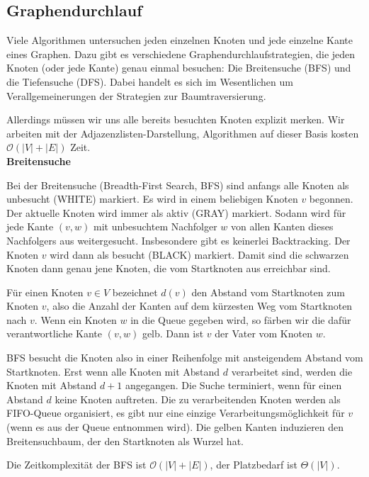 \documentclass[12pt]{article}
\begin{document}
\subsection{Graphendurchlauf}

Viele Algorithmen untersuchen jeden einzelnen Knoten und jede einzelne Kante eines Graphen. Dazu gibt es verschiedene Graphendurchlaufstrategien, die jeden Knoten (oder jede Kante) genau einmal besuchen: Die Breitensuche (BFS) und die Tiefensuche (DFS). Dabei handelt es sich im Wesentlichen um Verallgemeinerungen der Strategien zur Baumtraversierung.

Allerdings müssen wir uns alle bereits besuchten Knoten explizit merken. Wir arbeiten mit der Adjazenzlisten-Darstellung, Algorithmen auf dieser Basis kosten $\mathcal O(|V| + |E|)$ Zeit.\\

\textbf{Breitensuche}

Bei der Breitensuche (Breadth-First Search, BFS) sind anfangs alle Knoten als unbesucht (WHITE) markiert. Es wird in einem beliebigen Knoten $v$ begonnen. Der aktuelle Knoten wird immer als aktiv (GRAY) markiert. Sodann wird für jede Kante $(v, w)$ mit unbesuchtem Nachfolger $w$ von allen Kanten dieses Nachfolgers aus weitergesucht. Insbesondere gibt es keinerlei Backtracking. Der Knoten $v$ wird dann als besucht (BLACK) markiert. Damit sind die schwarzen Knoten dann genau jene Knoten, die vom Startknoten aus erreichbar sind.

Für einen Knoten $v \in V$ bezeichnet $d(v)$ den Abstand vom Startknoten zum Knoten $v$, also die Anzahl der Kanten auf dem kürzesten Weg vom Startknoten nach $v$. Wenn ein Knoten $w$ in die Queue gegeben wird, so färben wir die dafür verantwortliche Kante $(v, w)$ gelb. Dann ist $v$ der Vater vom Knoten $w$.

BFS besucht die Knoten also in einer Reihenfolge mit ansteigendem Abstand vom Startknoten. Erst wenn alle Knoten mit Abstand $d$ verarbeitet sind, werden die Knoten mit Abstand $d+1$ angegangen. Die Suche terminiert, wenn für einen Abstand $d$ keine Knoten auftreten. Die zu verarbeitenden Knoten werden als FIFO-Queue organisiert, es gibt nur eine einzige Verarbeitungsmöglichkeit für $v$ (wenn es aus der Queue entnommen wird). Die gelben Kanten induzieren den Breitensuchbaum, der den Startknoten als Wurzel hat.

Die Zeitkomplexität der BFS ist $\mathcal O(|V| + |E|)$, der Platzbedarf ist $\Theta(|V|)$.\\
\end{document}
